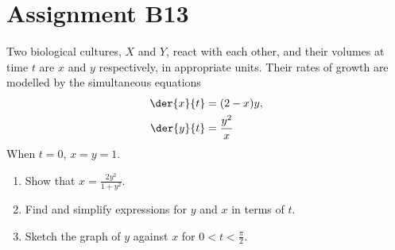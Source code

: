 \section{Assignment B13}

\begin{problem}
    Two biological cultures, $X$ and $Y$, react with each other, and their volumes at time $t$ are $x$ and $y$ respectively, in appropriate units. Their rates of growth are modelled by the simultaneous equations
    \begin{align*}
        \der{x}{t} &= (2-x)y,\\
        \der{y}{t} &= \frac{y^2}{x}
    \end{align*}
    When $t = 0$, $x = y = 1$.
    \begin{enumerate}
        \item Show that $x = \frac{2y^2}{1+y^2}$.
        \item Find and simplify expressions for $y$ and $x$ in terms of $t$.
        \item Sketch the graph of $y$ against $x$ for $0 < t < \frac\pi2$.
    \end{enumerate}
\end{problem}
